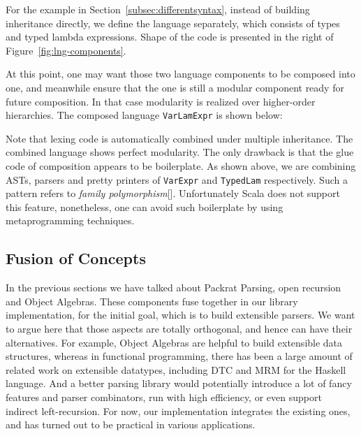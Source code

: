 For the example in Section~\ref{subsec:differentsyntax}, instead of building inheritance directly, we define the language separately,
which consists of types and typed lambda expressions. Shape of the code is presented in the right of Figure~\ref{fig:lng-components}.

At this point, one may want those two language components to be composed into one, and meanwhile ensure that the one is still a modular
component ready for future composition. In that case modularity is realized over higher-order hierarchies. The composed language \lstinline{VarLamExpr}
is shown below:

Note that lexing code is automatically combined under multiple inheritance. The combined language shows perfect modularity. The only
drawback is that the glue code of composition appears to be boilerplate. As shown above, we are combining ASTs, parsers and pretty printers of
\lstinline{VarExpr} and \lstinline{TypedLam} respectively. Such a pattern refers to \textit{family polymorphism}[]. Unfortunately Scala does not
support this feature, nonetheless, one can avoid such boilerplate by using metaprogramming techniques.

\subsection{Fusion of Concepts}\label{subsec:fusion}


In the previous sections we have talked about Packrat Parsing, open recursion and Object Algebras. These components fuse together in our library implementation, for the initial goal, which is to build extensible parsers. We want to argue here that those aspects are totally orthogonal, and hence can have their alternatives. For example, Object Algebras are helpful to build extensible data structures, whereas in functional programming, there has been a large amount of related work on extensible datatypes, including DTC and MRM for the Haskell language. And a better
parsing library would potentially introduce a lot of fancy features and parser combinators, run with high efficiency, or even support indirect left-recursion.
 For now, our implementation integrates the existing ones, and has turned out to be practical in various applications.

